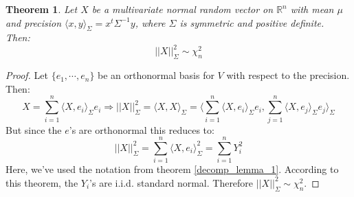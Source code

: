 \documentclass[12pt, a4paper]{article}
\newtheorem{theorem}{Theorem}[section]
\numberwithin{equation}{section}
\begin{document}
\begin{theorem}
\label{decomp_lemma_2}
Let $X$ be a multivariate normal random vector on $\mathbb{R}^n$ with mean $\mu$ and precision $\langle x,y\rangle_\Sigma=x^t\Sigma^{-1}y$, where $\Sigma$ is symmetric and positive definite. Then:
\begin{equation}
||X||^2_\Sigma\sim\chi^2_n
\end{equation}
\end{theorem}
\begin{proof}
Let $\{e_1,\cdots,e_n\}$ be an orthonormal basis for $V$ with respect to the precision. Then: 
\begin{equation}
X=\sum_{i=1}^n\langle X,e_i\rangle_\Sigma e_i\Rightarrow||X||^2_\Sigma=\langle X,X\rangle_\Sigma=\langle\sum_{i=1}^n\langle X,e_i\rangle_\Sigma e_i,\sum_{j=1}^n\langle X,e_j\rangle_\Sigma e_j\rangle_\Sigma
\end{equation}
But since the $e$'s are orthonormal this reduces to:
\begin{equation}
||X||^2_\Sigma=\sum_{i=1}^n\langle X,e_i\rangle^2_\Sigma=\sum_{i=1}^n Y_i^2
\end{equation}
Here, we've used the notation from theorem \ref{decomp_lemma_1}. According to this theorem, the $Y_i$'s are i.i.d. standard normal. Therefore $||X||^2_\Sigma\sim\chi^2_n$.
\end{proof}
\end{document}
